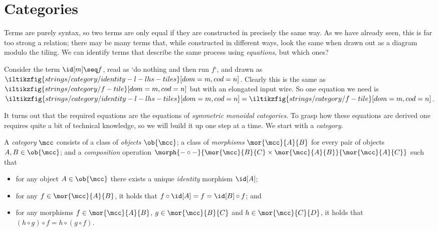 \section{Categories}\label{sec:categories}

Terms are purely syntax, so two terms are only equal if they are constructed in
precisely the same way.
As we have already seen, this is far too strong a relation; there may be
many terms that, while constructed in different ways, look the same when drawn
out as a diagram modulo the tiling.
We can identify terms that describe the same process using \emph{equations}, but
which ones?

\begin{example}
    Consider the term \(\id[m] \seq f\), read as `do nothing and
    then run \(f\)`, and drawn as \(
    \iltikzfig{strings/category/identity-l-lhs-tiles}[dom=m,cod=n]
    \).
    Clearly this is the same as \(
    \iltikzfig{strings/category/f-tile}[dom=m,cod=n]
    \) but with an elongated input wire.
    So one equation we need is \(
    \iltikzfig{strings/category/identity-l-lhs-tiles}[dom=m,cod=n]
    =
    \iltikzfig{strings/category/f-tile}[dom=m,cod=n]
    \).
\end{example}

It turns out that the required equations are the equations of
\emph{symmetric monoidal categories}.
To grasp how these equations are derived one requires quite a
bit of technical knowledge, so we will build it up one step at a time.
We start with a \emph{category}.

\begin{definition}[Category]
    \label{def:category}
    A \emph{category} \(\mcc\) consists of a class of \emph{objects}
    \(\ob{\mcc}\); a class of \emph{morphisms} \(\mor{\mcc}{A}{B}\)
    for every pair of objects \(A, B \in \ob{\mcc}\); and a \emph{composition}
    operation \(
    \morph{
        {-} \circ {-}
    }{
        \mor{\mcc}{B}{C} \times \mor{\mcc}{A}{B}
    }{
        \mor{\mcc}{A}{C}
    }
    \) such that
    \begin{itemize}
        \item
              for any object \(A \in \ob{\mcc}\) there exists a unique
              \emph{identity} morphism \(\id[A]\);
        \item
              for any \(f \in \mor{\mcc}{A}{B}\), it holds that \(
              f \circ \id[A] = f = \id[B] \circ f
              \); and
        \item for any morphisms \(
              f \in \mor{\mcc}{A}{B}
              \), \(
              g \in \mor{\mcc}{B}{C}
              \) and \(h \in \mor{\mcc}{C}{D}\), it holds that \(
              (h \circ g) \circ f = h \circ (g \circ f).
              \)
    \end{itemize}
\end{definition}

